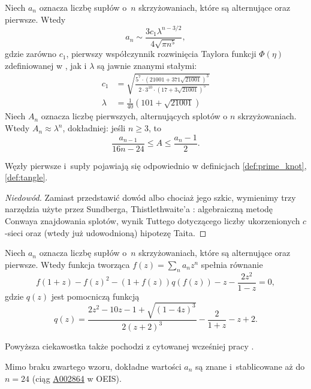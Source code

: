 \begin{proposition}
%
    Niech $a_n$ oznacza liczbę supłów o~$n$ skrzyżowaniach, które są alternujące oraz pierwsze.
    Wtedy
    \begin{equation}
        a_n \sim \frac{3c_1 \lambda^{n-3/2}}{4\sqrt{\pi n^{5}}},
    \end{equation}
    gdzie zarówno $c_1$, pierwszy współczynnik rozwinięcia Taylora funkcji $\Phi(\eta)$ zdefiniowanej w \cite{sundberg1998}, jak i $\lambda$ są jawnie znanymi stałymi:
    \begin{align}
        c_1 & = \sqrt{\frac{5^7 \cdot (21001 + 371 \sqrt{21001})^3}{2 \cdot 3^{10} \cdot (17 + 3\sqrt{21001})^5}} \\
        \lambda & = \frac {1}{40} (101 + \sqrt{21001})
    \end{align}
    Niech $A_n$ oznacza liczbę pierwszych, alternujących splotów o $n$ skrzyżowaniach.
    Wtedy $A_n \approx \lambda^n$, dokładniej: jeśli $n \ge 3$, to
    \begin{equation}
        \frac{a_{n-1}}{16n - 24} \le A \le \frac{a_n - 1}{2}.
    \end{equation}
\end{proposition}

Węzły pierwsze i~supły pojawiają się odpowiednio w definicjach \ref{def:prime_knot}, \ref{def:tangle}.

\begin{proof}[Niedowód]
%
%
    Zamiast przedstawić dowód albo chociaż jego szkic, wymienimy trzy narzędzia użyte przez Sundberga, Thistlethwaite'a \cite{sundberg1998}:
    algebraiczną metodę Conwaya znajdowania splotów,
    wynik Tuttego dotyczącego liczby ukorzenionych $c$-sieci
    oraz (wtedy już udowodnioną) hipotezę Taita.
%
%
%
\end{proof}

\begin{proposition}
    Niech $a_n$ oznacza liczbę supłów o~$n$ skrzyżowaniach, które są alternujące oraz pierwsze.
    Wtedy funkcja tworząca $f(z) = \sum_n a_n z^n$ spełnia równanie
    \begin{equation}
    f(1+z) - f(z)^2 - (1+f(z))q(f(z)) -z - \frac{2z^2}{1-z} = 0,
    \end{equation}
    gdzie $q(z)$ jest pomocniczą funkcją
    \begin{equation}
        q(z) = \frac{2z^2 - 10z - 1 + \sqrt{(1-4z)^3}} {2(z+2)^3} - \frac{2}{1+z} -z + 2.
    \end{equation}
\end{proposition}

Powyższa ciekawostka także pochodzi z cytowanej wcześniej pracy \cite{sundberg1998}.

Mimo braku zwartego wzoru, dokładne wartości $a_n$ są znane i~stablicowane aż do $n = 24$ (ciąg \href{https://oeis.org/A002864}{A002864} w OEIS).


